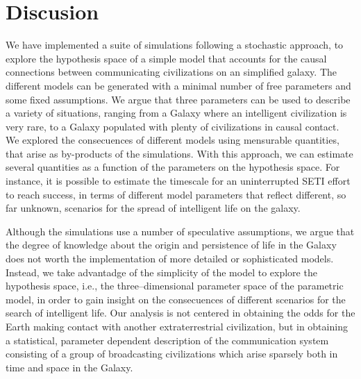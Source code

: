 \documentclass[crop]{CSLB}
\begin{document}
\maketitle




                      




\section{Discusion}\label{S_discussion}

We have implemented a suite of simulations following a stochastic
approach, to explore the hypothesis space of a simple model that
accounts for the causal connections between communicating
civilizations on an simplified galaxy.
%
The different models can be generated with a minimal number of free
parameters and some fixed assumptions.
%
We argue that three parameters can be used to describe a variety of
situations, ranging from a Galaxy where an intelligent civilization is
very rare, to a Galaxy populated with plenty of civilizations in
causal contact.
%
We explored the consecuences of different models using mensurable
quantities, that arise as by-products of the simulations.
%
With this approach, we can estimate several quantities as a function
of the parameters on the hypothesis space.
%
For instance, it is possible to estimate the timescale for an
uninterrupted SETI effort to reach success, in terms of different
model parameters that reflect different, so far unknown, scenarios for
the spread of intelligent life on the galaxy.


Although the simulations use a number of speculative assumptions, we
argue that the degree of knowledge about the origin and persistence of
life in the Galaxy does not worth the implementation of more detailed
or sophisticated models.
%
Instead, we take advantadge of the simplicity of the model to explore
the hypothesis space, i.e., the three--dimensional parameter space of
the parametric model, in order to gain insight on the consecuences of
different scenarios for the search of intelligent life.
%
Our analysis is not centered in obtaining the odds for the Earth
making contact with another extraterrestrial civilization, but in
obtaining a statistical, parameter dependent description of the
communication system consisting of a group of broadcasting
civilizations which arise sparsely both in time and space in the
Galaxy.
\end{document}
